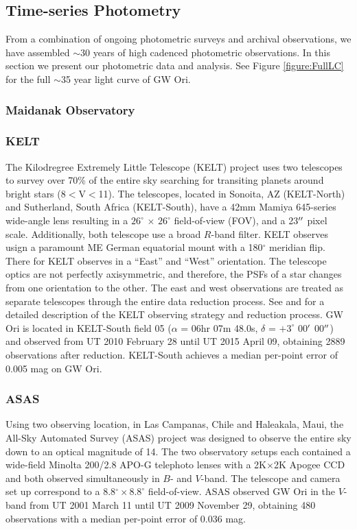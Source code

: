 \documentclass[twocolumn]{aastex61}
\begin{document}
\subsection{Time-series Photometry}
From a combination of ongoing photometric surveys and archival observations, we have assembled $\sim$30 years of high cadenced photometric observations. In this section we present our photometric data and analysis. See Figure \ref{figure:FullLC} for the full $\sim$35 year light curve of GW Ori.


\subsubsection{Maidanak Observatory}

\subsubsection{KELT}
The Kilodregree Extremely Little Telescope (KELT) project uses two telescopes to survey over 70\% of the entire sky searching for transiting planets around bright stars (8$<$V$<$11). The telescopes, located in Sonoita, AZ (KELT-North) and Sutherland, South Africa (KELT-South), have a 42mm Mamiya 645-series wide-angle lens resulting in a $26^{\circ}$ $\times$ $26^{\circ}$ field-of-view (FOV), and a 23$\mbox{$^{\prime\prime}$}$ pixel scale. Additionally, both telescope use a broad $R$-band filter. KELT observes usign a paramount ME German equatorial mount with a 180$^{\circ}$ meridian flip. There for KELT observes in a ``East'' and ``West'' orientation. The telescope optics are not perfectly axisymmetric, and therefore, the PSFs of a star changes from one orientation to the other. The east and west observations are treated as separate telescopes through the entire data reduction process. See \citet{Siverd12} and \citet{Kuhn16} for a detailed description of the KELT observing strategy and reduction process. GW Ori is located in KELT-South field 05 ($\alpha$ =  06hr 07m 48.0s, $\delta$ = $+3^{\circ}$ 00$\mbox{$^\prime$}$ 00$\mbox{$^{\prime\prime}$}$) and observed from UT 2010 February 28 until UT 2015 April 09, obtaining 2889 observations after reduction. KELT-South achieves a median per-point error of 0.005 mag on GW Ori.

\subsubsection{ASAS}
Using two observing location, in Las Campanas, Chile and Haleakala, Maui, the All-Sky Automated Survey (ASAS) project was designed to observe the entire sky down to an optical magnitude of 14. The two observatory setups each contained a wide-field Minolta 200/2.8 APO-G telephoto lenses with a 2K$\times$2K Apogee CCD and both observed simultaneously in $B$- and $V$-band. The telescope and camera set up correspond to a 8.8$^{\circ}\times8.8^{\circ}$ field-of-view. ASAS observed GW Ori in the $V$-band from UT 2001 March 11 until UT 2009 November 29, obtaining 480 observations with a median per-point error of 0.036 mag.
\end{document}
